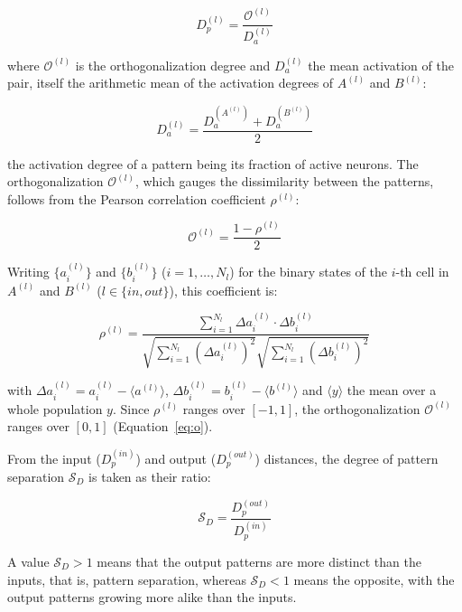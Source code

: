 \documentclass[pdflatex,sn-basic]{sn-jnl}%
\theoremstyle{thmstyleone}%
\theoremstyle{thmstyletwo}%
\theoremstyle{thmstylethree}%
\begin{document}
\begin{equation}
    \label{eq:dp}
    D_p^{(l)} = \frac{\mathcal{O}^{(l)}}{D_a^{(l)}}
\end{equation}

where $\mathcal{O}^{(l)}$ is the orthogonalization degree  and $D_a^{(l)}$ the mean activation of the pair, itself the arithmetic mean of
the activation degrees of $A^{(l)}$ and $B^{(l)}$:

\begin{equation}
    \label{eq:da}
    D_a^{(l)} = \frac{D_a^{(A^{(l)})} + D_a^{(B^{(l)})}}{2}
\end{equation}

the activation degree of a pattern being its fraction of active neurons. The orthogonalization $\mathcal{O}^{(l)}$, which gauges the
dissimilarity between the patterns, follows from the Pearson correlation coefficient $\rho^{(l)}$:

\begin{equation}
    \label{eq:o}
    \mathcal{O}^{(l)} = \frac{1 - \rho^{(l)}}{2}
\end{equation}

Writing $\{a_i^{(l)}\}$ and $\{b_i^{(l)}\}$ ($i=1, \dots, N_l$) for the binary states of the $i$-th cell in $A^{(l)}$ and
$B^{(l)}$ ($l \in \{in, out\}$), this coefficient is:

\begin{equation}
    \label{eq:pearson}
    \rho^{(l)} = \frac{\sum_{i=1}^{N_l} \Delta a_i^{(l)} \cdot \Delta b_i^{(l)}}{\sqrt{\sum_{i=1}^{N_l} {(\Delta a_i^{(l)})}^2} \sqrt{\sum_{i=1}^{N_l} {(\Delta b_i^{(l)})}^2}}
\end{equation}

with $\Delta a_i^{(l)} = a_i^{(l)} - \langle a^{(l)} \rangle$, $\Delta b_i^{(l)} = b_i^{(l)} - \langle b^{(l)} \rangle$ and
$\langle y \rangle$ the mean over a whole population $y$. Since $\rho^{(l)}$ ranges over $[-1, 1]$, the orthogonalization
$\mathcal{O}^{(l)}$ ranges over $[0, 1]$ (Equation~\ref{eq:o}).

From the input ($D_p^{(in)}$) and output ($D_p^{(out)}$) distances, the degree of pattern separation $\mathcal{S}_D$ is taken as
their ratio:

\begin{equation}
    \label{eq:sd}
    \mathcal{S}_D = \frac{D_p^{(out)}}{D_p^{(in)}}
\end{equation}

A value $\mathcal{S}_D > 1$ means that the output patterns are more distinct than the inputs, that is, pattern separation, whereas
$\mathcal{S}_D < 1$ means the opposite, with the output patterns growing more alike than the inputs.
\end{document}
